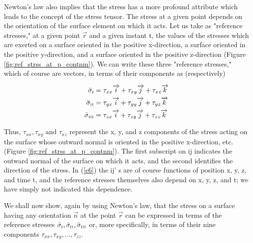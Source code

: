 \documentclass{article}
\begin{document}
{Newton's law also implies that the stress has a more profound attribute which leads to the concept of the stress tensor. The stress at a given point depends on the orientation of the surface element on which it acts. Let us take as "reference stresses," at a given point $\overrightarrow{r}$ and a given instant t, the values of the stresses which are exerted on a surface oriented in the positive x-direction, a surface oriented in the positive y-direction, and a surface oriented in the positive z-direction (Figure \ref{fig:ref_strss_at_p_contnm}). We can write these three "reference stresses," which of course are vectors, in terms of their components as (respectively)

\begin{equation}
\begin{split}
\bar{\sigma}_{\text{\tiny{I}}} &= \tau_{xx}\overrightarrow{i} + \tau_{xy}\overrightarrow{j} + \tau_{xz} \overrightarrow{k}\\
\bar{\sigma}_{\text{\tiny{II}}} &= \tau_{yx}\overrightarrow{i} + \tau_{yy}\overrightarrow{j} + \tau_{yz} \overrightarrow{k}\\
\bar{\sigma}_{\text{\tiny{III}}} &= \tau_{zx}\overrightarrow{i} + \tau_{zy}\overrightarrow{j} + \tau_{zz} \overrightarrow{k}\\
\end{split} \label{e6}
\end{equation}

Thus, $\tau_{xx} , \tau_{xy} \text{ and } \tau_{xz}$ represent the x, y, and z components of the stress acting on the surface whose outward normal is oriented in the positive x-direction, etc. (Figure \ref{fig:ref_strss_at_p_contnm}). The first subscript on ij indicates the outward normal of the surface on which it acts, and the second  identifies the direction of the stress. In (\ref{e6}) the ij' s are of course functions of position x, y, z, and time t, and the reference stresses themselves also depend on x, y, z, and t; we have simply not indicated this dependence.

We shall now show, again by using Newton's law, that the stress on a surface having any orientation $\overrightarrow{n}$ at the point $\overrightarrow{r}$ can be expressed in terms of the reference stresses $\bar{\sigma}_{\text{\tiny{I}}},\bar{\sigma}_{\text{\tiny{II}}},\bar{\sigma}_{\text{\tiny{III}}}$ or, more specifically, in terms of their nine components
$\tau_{xx}, \tau_{xy},...,\tau_{zz}$.

}
\end{document}
